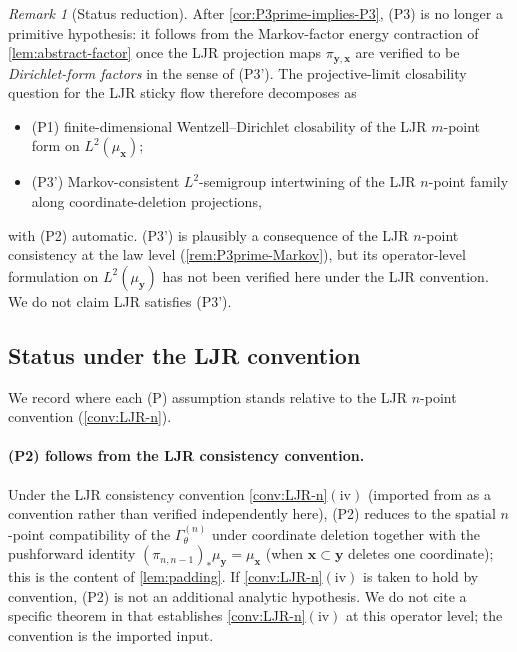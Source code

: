 \documentclass[11pt,reqno]{amsart}
\theoremstyle{plain}
\theoremstyle{definition}
\theoremstyle{remark}
\newtheorem{remark}[theorem]{Remark}
\newcommand{\GamM}[1]{\Gamma^{(#1)}_{\theta}}
\begin{document}
\begin{remark}[Status reduction]\label{rem:status-reduction}
After \cref{cor:P3prime-implies-P3}, (P3) is no longer a primitive
hypothesis: it follows from the Markov-factor energy contraction of
\cref{lem:abstract-factor} once the LJR projection maps
$\pi_{\mathbf y,\mathbf x}$ are verified to be \emph{Dirichlet-form
factors} in the sense of (P3'). The projective-limit closability
question for the LJR sticky flow therefore decomposes as
\begin{itemize}
\item (P1) finite-dimensional Wentzell--Dirichlet closability of
the LJR $m$-point form on $L^{2}(\mu_{\mathbf x})$;
\item (P3') Markov-consistent $L^{2}$-semigroup intertwining of the
LJR $n$-point family along coordinate-deletion projections,
\end{itemize}
with (P2) automatic. (P3') is plausibly a consequence of the LJR
$n$-point consistency at the law level
(\cref{rem:P3prime-Markov}), but its operator-level formulation on
$L^{2}(\mu_{\mathbf y})$ has not been verified here under the LJR
convention. We do not claim LJR satisfies (P3').
\end{remark}

\subsection{Status under the LJR convention}\label{sec:formclos-LJR-status}

We record where each (P) assumption stands relative to the LJR
$n$-point convention (\cref{conv:LJR-n}).

\paragraph{(P2) follows from the LJR consistency convention.}
Under the LJR consistency convention
\cref{conv:LJR-n}$(\mathrm{iv})$ (imported from
\cite[\S 3--4]{LeJanRaimond2004} as a convention rather than
verified independently here), (P2) reduces to the spatial
$n$-point compatibility of the $\GamM{n}$ under coordinate
deletion together with the pushforward identity
$(\pi_{n,n-1})_{*}\mu_{\mathbf y}=\mu_{\mathbf x}$
(when $\mathbf x\subset\mathbf y$ deletes one coordinate); this
is the content of \cref{lem:padding}. If
\cref{conv:LJR-n}$(\mathrm{iv})$ is taken to hold by convention,
(P2) is not an additional analytic hypothesis. We do not cite a
specific theorem in \cite{LeJanRaimond2004} that establishes
\cref{conv:LJR-n}$(\mathrm{iv})$ at this operator level; the
convention is the imported input.
\end{document}
